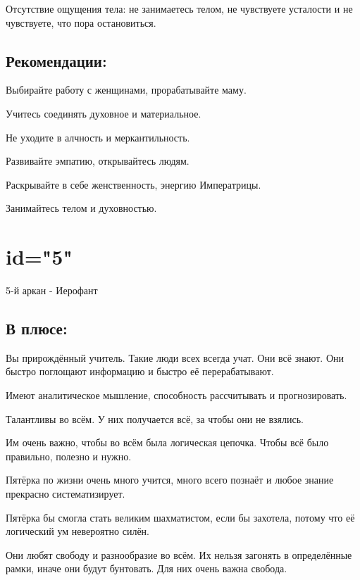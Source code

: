 \item Отсутствие ощущения тела: не занимаетесь телом, не чувствуете усталости и не чувствуете,
что пора остановиться.
\endsubsection

\subsection{Рекомендации:}
\item Выбирайте работу с женщинами, прорабатывайте маму. 
\item Учитесь соединять духовное и материальное.
\item Не уходите в алчность и меркантильность.
\item Развивайте эмпатию, открывайтесь людям. 
\item Раскрывайте в себе женственность, энергию Императрицы. 
\item Занимайтесь телом и духовностью. 
\endsubsection

\endsection

\section{id="5"}{5-й аркан - Иерофант}

\subsection{В плюсе:}
\item Вы прирождённый учитель. Такие люди всех всегда учат. Они всё знают. Они быстро поглощают информацию и быстро её перерабатывают.
\item Имеют аналитическое мышление, способность рассчитывать и прогнозировать.
\item Талантливы во всём. У них получается всё, за чтобы они не взялись.
\item Им очень важно, чтобы во всём была логическая цепочка. Чтобы всё было правильно, полезно и нужно.
\item Пятёрка по жизни очень много учится, много всего познаёт и любое знание прекрасно систематизирует.
\item Пятёрка бы смогла стать великим шахматистом, если бы захотела, потому что её логический ум невероятно силён.
\item Они любят свободу и разнообразие во всём. Их нельзя загонять в определённые рамки, иначе они будут бунтовать. Для них очень важна свобода.
\endsubsection

